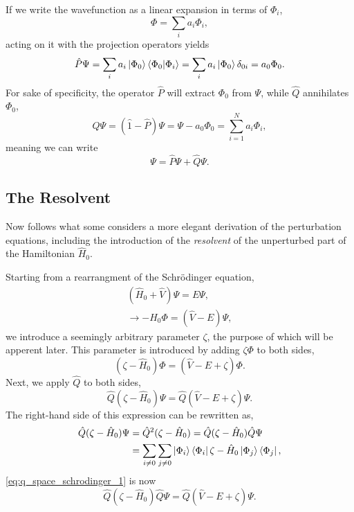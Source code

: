 If we write the wavefunction as a linear expansion in terms of $\Phi_i$,
\begin{equation}
    \Phi = \sum_i a_i \Phi_i,
\end{equation}
acting on it with the projection operators yields
\begin{equation}
    \hat{P} \Psi = \sum_i a_i \ket{\Phi_0}\bra{\Phi_0}\ket{\Phi_i}
        = \sum_i a_i\ket{\Phi_0}\delta_{0i} = a_0\Phi_0.
\end{equation}
For sake of specificity, the operator $\hat{P}$ will extract $\Phi_0$ from 
$\Psi$, while $\hat{Q}$ annihilates $\Phi_0$,
\begin{equation}
    \hat{Q}\Psi = (\hat{1} - \hat{P})\Psi = \Psi - a_0\Phi_0 
        = \sum_{i=1}^N a_i\Phi_i,
\end{equation}
meaning we can write
\begin{equation}
    \Psi = \hat{P} \Psi + \hat{Q} \Psi.
\end{equation}

\subsection{The Resolvent}
Now follows what some considers a more elegant derivation of the perturbation equations,
including the introduction of the \emph{resolvent} of the unperturbed part of the Hamiltonian
$\hat{H}_0$.

Starting from a rearrangment of the Schrödinger equation,
\begin{equation}
    \begin{gathered}
        (\hat{H}_0 + \hat{V})\Psi = E\Psi, \\
        \to -\hat{H}_0 \Phi = (\hat{V} - E)\Psi,
    \end{gathered}
\end{equation}
we introduce a seemingly arbitrary parameter $\zeta$, the purpose of which will be 
apperent later. This parameter is introduced by adding $\zeta\Phi$ to both sides,
\begin{equation}
    (\zeta - \hat{H}_0)\Phi = (\hat{V} - E + \zeta)\Phi.
\end{equation}
Next, we apply $\hat{Q}$ to both sides,
\begin{equation}
    \label{eq:q_space_schrodinger_1} 
    \hat{Q}(\zeta - \hat{H}_0)\Psi = \hat{Q}(\hat{V} - E + \zeta)\Psi.
\end{equation}
The right-hand side of this expression can be rewritten as,
\begin{equation}
    \begin{aligned}
    \hat{Q}(\zeta - \hat{H}_0)\Psi &= \hat{Q}^2(\zeta - \hat{H}_0)
        = \hat{Q}(\zeta - \hat{H}_0)\hat{Q}\Psi \\
        &= \sum_{i \neq 0} \sum_{j \neq 0} \ket{\Phi_i} \bra{\Phi_i}
            \zeta - \hat{H}_0 \ket{\Phi_j} \bra{\Phi_j},
    \end{aligned}
\end{equation}
\autoref{eq:q_space_schrodinger_1} is now 
\begin{equation}
    \label{eq:q_space_schrodinger_2}
    \hat{Q}(\zeta - \hat{H}_0)\hat{Q}\Psi = \hat{Q}(\hat{V} - E + \zeta)\Psi.
\end{equation}

